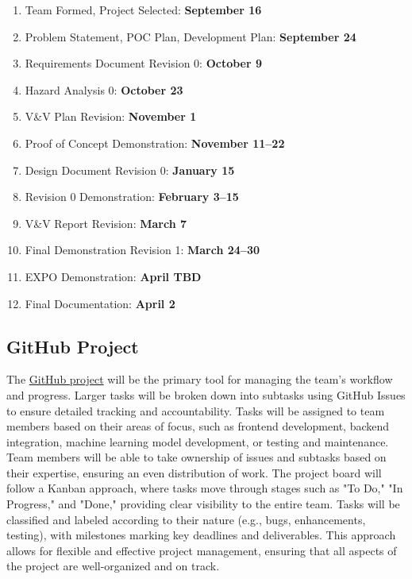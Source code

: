 \documentclass{article}
\begin{document}
\begin{enumerate}
    \item Team Formed, Project Selected: \hfill\textbf{September 16}
    \item Problem Statement, POC Plan, Development Plan: \hfill\textbf{September
    24}
    \item Requirements Document Revision 0: \hfill\textbf{October 9}
    \item Hazard Analysis 0: \hfill\textbf{October 23}
    \item V\&V Plan Revision: \hfill\textbf{November 1}
    \item Proof of Concept Demonstration: \hfill\textbf{November 11--22}
    \item Design Document Revision 0: \hfill\textbf{January 15}
    \item Revision 0 Demonstration: \hfill\textbf{February 3--15}
    \item V\&V Report Revision: \hfill\textbf{March 7}
    \item Final Demonstration Revision 1: \hfill\textbf{March 24--30}
    \item EXPO Demonstration: \hfill\textbf{April TBD}
    \item Final Documentation: \hfill\textbf{April 2}
\end{enumerate}

\subsection*{GitHub Project}
The \href{https://github.com/users/harshc22/projects/2}{GitHub project} will be
the primary tool for managing the team’s workflow and progress. Larger tasks
will be broken down into subtasks using GitHub Issues to ensure detailed
tracking and accountability. Tasks will be assigned to team members based on
their areas of focus, such as frontend development, backend integration, machine
learning model development, or testing and maintenance. Team members will be
able to take ownership of issues and subtasks based on their expertise, ensuring
an even distribution of work. The project board will follow a Kanban approach,
where tasks move through stages such as "To Do," "In Progress," and "Done,"
providing clear visibility to the entire team. Tasks will be classified and
labeled according to their nature (e.g., bugs, enhancements, testing), with
milestones marking key deadlines and deliverables. This approach allows for
flexible and effective project management, ensuring that all aspects of the
project are well-organized and on track.
\end{document}

